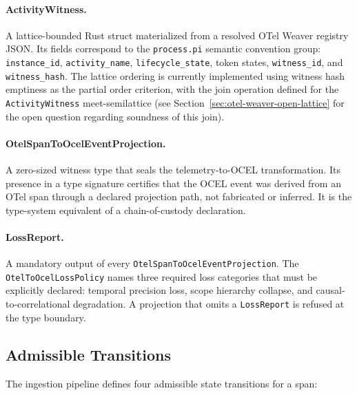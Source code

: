 \paragraph{ActivityWitness.}
A lattice-bounded Rust struct materialized from a resolved OTel Weaver registry JSON. Its fields
correspond to the \texttt{process.pi} semantic convention group: \texttt{instance\_id},
\texttt{activity\_name}, \texttt{lifecycle\_state}, token states, \texttt{witness\_id}, and
\texttt{witness\_hash}. The lattice ordering is currently implemented using witness hash emptiness
as the partial order criterion, with the join operation defined for the \texttt{ActivityWitness}
meet-semilattice (see Section~\ref{sec:otel-weaver-open-lattice} for the open question regarding
soundness of this join).

\paragraph{OtelSpanToOcelEventProjection.}
A zero-sized witness type that seals the telemetry-to-OCEL transformation. Its presence in a
type signature certifies that the OCEL event was derived from an OTel span through a declared
projection path, not fabricated or inferred. It is the type-system equivalent of a chain-of-custody
declaration.

\paragraph{LossReport.}
A mandatory output of every \texttt{OtelSpanToOcelEventProjection}. The \texttt{OtelToOcelLossPolicy}
names three required loss categories that must be explicitly declared: temporal precision loss,
scope hierarchy collapse, and causal-to-correlational degradation. A projection that omits a
\texttt{LossReport} is refused at the type boundary.

\subsection{Admissible Transitions}
\label{sec:otel-weaver-arch-transitions}

The ingestion pipeline defines four admissible state transitions for a span:

